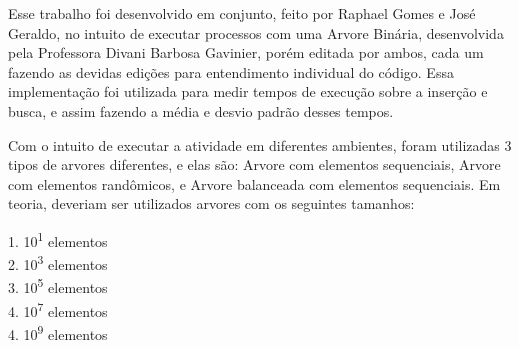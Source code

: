 \label{Introdução}

Esse trabalho foi desenvolvido em conjunto, feito por Raphael Gomes e José Geraldo, no intuito de executar processos com uma Arvore Binária, desenvolvida pela Professora Divani Barbosa Gavinier\cite{divanibarbosa}, porém editada por ambos, cada um fazendo as devidas edições para entendimento individual do código. Essa implementação foi utilizada para medir tempos de execução sobre a inserção e busca, e assim fazendo a média e desvio padrão desses tempos. 

Com o intuito de executar a atividade em diferentes ambientes, foram utilizadas 3 tipos de arvores diferentes, e elas são: Arvore com elementos sequenciais, Arvore com elementos randômicos, e Arvore balanceada com elementos sequenciais. Em teoria, deveriam ser utilizados arvores com os seguintes tamanhos:
        \begin{center}
        1. 10\textsuperscript{1} elementos\\ 
        2. 10\textsuperscript{3} elementos\\
        3. 10\textsuperscript{5} elementos\\ 
        4. 10\textsuperscript{7} elementos\\
        4. 10\textsuperscript{9} elementos
        \end{center}

